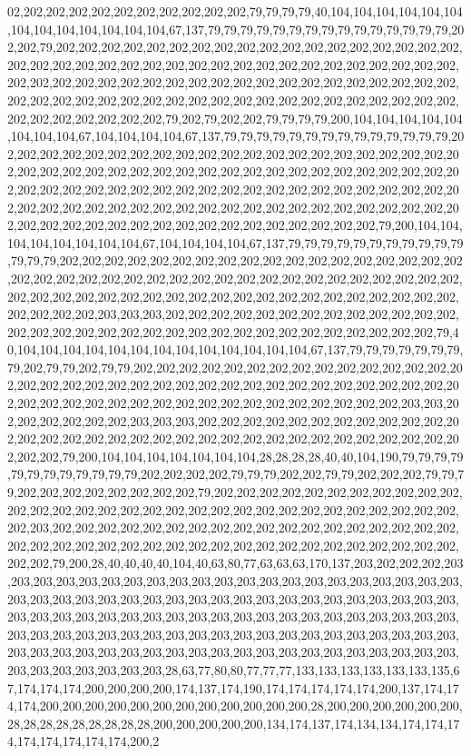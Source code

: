 02,202,202,202,202,202,202,202,202,202,202,79,79,79,79,40,104,104,104,104,104,104,104,104,104,104,104,104,104,67,137,79,79,79,79,79,79,79,79,79,79,79,79,79,79,79,202,202,79,202,202,202,202,202,202,202,202,202,202,202,202,202,202,202,202,202,202,202,202,202,202,202,202,202,202,202,202,202,202,202,202,202,202,202,202,202,202,202,202,202,202,202,202,202,202,202,202,202,202,202,202,202,202,202,202,202,202,202,202,202,202,202,202,202,202,202,202,202,202,202,202,202,202,202,202,202,202,202,202,202,202,202,202,202,79,202,79,202,202,79,79,79,79,200,104,104,104,104,104,104,104,104,67,104,104,104,104,67,137,79,79,79,79,79,79,79,79,79,79,79,79,79,79,202,202,202,202,202,202,202,202,202,202,202,202,202,202,202,202,202,202,202,202,202,202,202,202,202,202,202,202,202,202,202,202,202,202,202,202,202,202,202,202,202,202,202,202,202,202,202,202,202,202,202,202,202,202,202,202,202,202,202,202,202,202,202,202,202,202,202,202,202,202,202,202,202,202,202,202,202,202,202,202,202,202,202,202,202,202,202,202,202,202,202,202,202,202,202,202,202,79,200,104,104,104,104,104,104,104,104,67,104,104,104,104,67,137,79,79,79,79,79,79,79,79,79,79,79,79,79,79,202,202,202,202,202,202,202,202,202,202,202,202,202,202,202,202,202,202,202,202,202,202,202,202,202,202,202,202,202,202,202,202,202,202,202,202,202,202,202,202,202,202,202,202,202,202,202,202,202,202,202,202,202,202,202,202,202,202,202,202,202,202,203,203,203,202,202,202,202,202,202,202,202,202,202,202,202,202,202,202,202,202,202,202,202,202,202,202,202,202,202,202,202,202,202,202,202,79,40,104,104,104,104,104,104,104,104,104,104,104,104,104,67,137,79,79,79,79,79,79,79,79,202,79,79,202,79,79,202,202,202,202,202,202,202,202,202,202,202,202,202,202,202,202,202,202,202,202,202,202,202,202,202,202,202,202,202,202,202,202,202,202,202,202,202,202,202,202,202,202,202,202,202,202,202,202,202,202,202,202,203,203,202,202,202,202,202,202,203,203,203,202,202,202,202,202,202,202,202,202,202,202,202,202,202,202,202,202,202,202,202,202,202,202,202,202,202,202,202,202,202,202,202,202,202,79,200,104,104,104,104,104,104,104,28,28,28,28,40,40,104,190,79,79,79,79,79,79,79,79,79,79,79,79,202,202,202,202,79,79,79,202,202,79,79,202,202,202,79,79,79,202,202,202,202,202,202,202,202,79,202,202,202,202,202,202,202,202,202,202,202,202,202,202,202,202,202,202,202,202,202,202,202,202,202,202,202,202,202,202,202,202,203,202,202,202,202,202,202,202,202,202,202,202,202,202,202,202,202,202,202,202,202,202,202,202,202,202,202,202,202,202,202,202,202,202,202,202,202,202,202,202,202,79,200,28,40,40,40,40,104,40,63,80,77,63,63,63,170,137,203,202,202,202,203,203,203,203,203,203,203,203,203,203,203,203,203,203,203,203,203,203,203,203,203,203,203,203,203,203,203,203,203,203,203,203,203,203,203,203,203,203,203,203,203,203,203,203,203,203,203,203,203,203,203,203,203,203,203,203,203,203,203,203,203,203,203,203,203,203,203,203,203,203,203,203,203,203,203,203,203,203,203,203,203,203,203,203,203,203,203,203,203,203,203,203,203,203,203,203,203,203,203,203,203,203,203,203,203,203,203,203,28,63,77,80,80,77,77,77,133,133,133,133,133,133,135,67,174,174,174,200,200,200,200,174,137,174,190,174,174,174,174,174,200,137,174,174,174,200,200,200,200,200,200,200,200,200,200,200,200,28,200,200,200,200,200,200,28,28,28,28,28,28,28,28,28,200,200,200,200,200,134,174,137,174,134,134,174,174,174,174,174,174,174,174,200,2